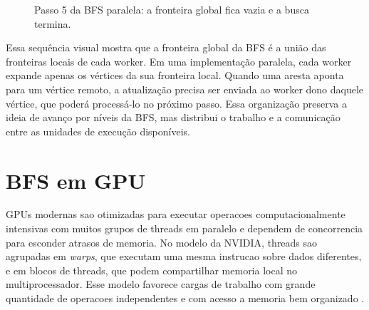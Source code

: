 \documentclass{article}
\begin{document}
\begin{figure}[H]
\centering
{}
\caption{Passo 5 da BFS paralela: a fronteira global fica vazia e a busca termina.}
\label{fig:bfs-paralela-step5}
\end{figure}

Essa sequência visual mostra que a fronteira global da BFS é a união das
fronteiras locais de cada worker. Em uma implementação paralela, cada worker
expande apenas os vértices da sua fronteira local. Quando uma aresta aponta para
um vértice remoto, a atualização precisa ser enviada ao worker dono daquele
vértice, que poderá processá-lo no próximo passo. Essa organização preserva a
ideia de avanço por níveis da BFS, mas distribui o trabalho e a comunicação entre
as unidades de execução disponíveis.

\section{BFS em GPU}
GPUs modernas sao otimizadas para executar operacoes computacionalmente intensivas 
com muitos grupos de threads em paralelo e dependem de concorrencia para esconder 
atrasos de memoria. No modelo da NVIDIA, threads sao agrupadas em \textit{warps}, 
que executam uma mesma instrucao sobre dados diferentes, e em blocos de threads, 
que podem compartilhar memoria local no multiprocessador. Esse modelo favorece 
cargas de trabalho com grande quantidade de operacoes independentes e com acesso 
a memoria bem organizado \cite{merrillgpu}.
\end{document}
